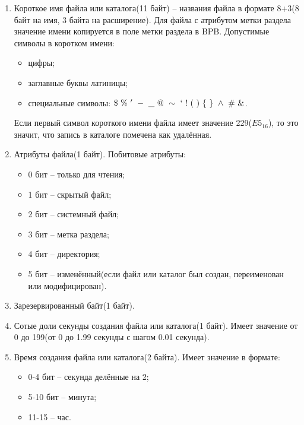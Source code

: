 \begin{enumerate}
\item Короткое имя файла или каталога(11 байт) -- названия файла в формате 8+3(8 байт на имя, 3 байта на расширение). Для файла с атрибутом метки раздела значение имени копируется в поле метки раздела в BPB. Допустимые символы в коротком имени:

	\begin{itemize}
	\item цифры;
	\item заглавные буквы латиницы;
	\item специальные символы: $\$~\%~'~-~\_~@~\sim~`~!~(~)~\{~\}~\wedge~\#~\&$.
	\end{itemize}
	
Если первый символ короткого имени файла имеет значение 229($E5_{16}$), то это значит, что запись в каталоге помечена как удалённая.
\item Атрибуты файла(1 байт). Побитовые атрибуты:

	\begin{itemize}
	\item 0 бит -- только для чтения;
	\item 1 бит -- скрытый файл;
	\item 2 бит -- системный файл;
	\item 3 бит -- метка раздела;
	\item 4 бит -- директория;
	\item 5 бит -- изменённый(если файл или каталог был создан, переименован или модифицирован).
	\end{itemize}
	
\item Зарезервированный байт(1 байт).
\item Сотые доли секунды создания файла или каталога(1 байт). Имеет значение от 0 до 199(от 0 до 1.99 секунды с шагом 0.01 секунда).
\item Время создания файла или каталога(2 байта). Имеет значение в формате:

	\begin{itemize}
	\item 0-4 бит -- секунда делённые на 2;
	\item 5-10 бит -- минута;
	\item 11-15 -- час.
	\end{itemize}
	

\end{enumerate}
